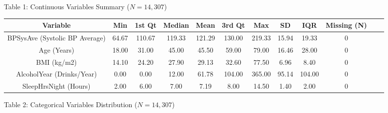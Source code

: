 \documentclass{article}
\begin{document}
\noindent
{\Large Table 1: Continuous Variables Summary ($N = 14,307$)}
\begin{center}
    \small
    \begin{tabular}{|c|c|c|c|c|c|c|c|c|c|c|c|}
        \hline
        Variable & Min & 1st Qt & Median & Mean & 3rd Qt & Max & SD & IQR & Missing (N) \\
        \hline
        BPSysAve (Systolic BP Average) & 64.67 & 110.67 & 119.33 & 121.29 & 130.00 & 219.33 & 15.94 & 19.33 & 0 \\
        \hline
        Age (Years) & 18.00 & 31.00 & 45.00 & 45.50 & 59.00 & 79.00 & 16.46 & 28.00 & 0 \\
        \hline
        BMI (kg/m2) & 14.10 & 24.20 & 27.90 & 29.13 & 32.60 & 77.50 & 6.96 & 8.40 & 0 \\
        \hline
        AlcoholYear (Drinks/Year) & 0.00 & 0.00 & 12.00 & 61.78 & 104.00 & 365.00 & 95.14 & 104.00 & 0 \\
        \hline
        SleepHrsNight (Hours) & 2.00 & 6.00 & 7.00 & 7.19 & 8.00 & 14.50 & 1.40 & 2.00 & 0 \\
        \hline
    \end{tabular}
\end{center}
\bigskip
{\Large Table 2: Categorical Variables Distribution ($N = 14,307$)}
\end{document}
